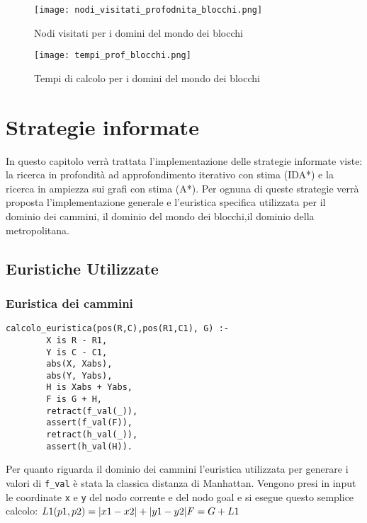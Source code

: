 \begin{figure}[htp]
  \texttt{[image: nodi\_visitati\_profodnita\_blocchi.png]}
  \caption{Nodi visitati per i domini del mondo dei blocchi}
  \label{fig:figure7}
\end{figure}

\begin{figure}[htp]
  \texttt{[image: tempi\_prof\_blocchi.png]}
  \caption{Tempi di calcolo per i domini del mondo dei blocchi}
  \label{fig:figure8}
\end{figure}

\chapter{Strategie informate}
In questo capitolo verrà trattata l'implementazione delle strategie informate viste: la ricerca in profondità ad approfondimento iterativo con stima (IDA*) e la ricerca in ampiezza sui grafi con stima (A*). Per ognuna di queste strategie verrà proposta l'implementazione generale e l'euristica specifica utilizzata per il dominio dei cammini, il dominio del mondo dei blocchi,il dominio della metropolitana.

\section{Euristiche Utilizzate}

\subsection{Euristica dei cammini}
\begin{lstlisting}
calcolo_euristica(pos(R,C),pos(R1,C1), G) :-
        X is R - R1,
        Y is C - C1,
        abs(X, Xabs),
        abs(Y, Yabs),
        H is Xabs + Yabs,
        F is G + H,
        retract(f_val(_)),
        assert(f_val(F)),
        retract(h_val(_)),
        assert(h_val(H)).
\end{lstlisting}

Per quanto riguarda il dominio dei cammini l'euristica utilizzata per generare i valori di \lstinline{f_val} è stata la classica distanza di Manhattan. Vengono presi in input le coordinate \lstinline{x} e \lstinline{y} del nodo corrente e del nodo goal e si esegue questo semplice calcolo:
\begin{math}
$$ L1(p1,p2) = |x1 - x2| + |y1 - y2|$$
$$F = G + L1$$
\end{math}

